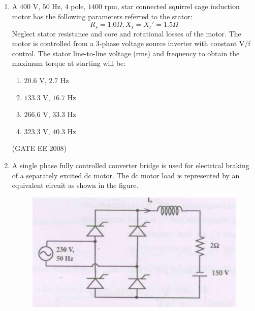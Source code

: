 \documentclass[journal,12pt,onecolumn]{IEEEtran}
\theoremstyle{remark}
\begin{document}
\begin{enumerate}[start=1, label=Q.\arabic*]
The inverter is operated at 50 Hz in $180\degree$ square wave mode. Assume that the load current does not have any dc component. The peak value of the inductor current $i_o$ will be

\begin{multicols}{4}
\begin{enumerate}[label=(\Alph*)]
    \item $6.37$ A
    \item $10$ A
    \item $20$ A
    \item $40$ A
\end{enumerate}
\end{multicols}
\hfill (GATE EE 2008)


\item A $400$ V, $50$ Hz, $4$ pole, $1400$ rpm, star connected squirrel cage induction motor has the following parameters referred to the stator:
$$
R_s = 1.0 \Omega, X_s = X_r' = 1.5 \Omega
$$
Neglect stator resistance and core and rotational losses of the motor.
The motor is controlled from a 3-phase voltage source inverter with constant V/f control. The stator line-to-line voltage (rms) and frequency to obtain the maximum torque at starting will be:

\begin{multicols}{4}
\begin{enumerate}[label=(\Alph*)]
    \item $20.6$ V, $2.7$ Hz
    \item $133.3$ V, $16.7$ Hz
    \item $266.6$ V, $33.3$ Hz
    \item $323.3$ V, $40.3$ Hz
\end{enumerate}
\end{multicols}
\hfill (GATE EE 2008)



\item A single phase fully controlled converter bridge is used for electrical braking of a separately excited dc motor. The dc motor load is represented by an equivalent circuit as shown in the figure.

\begin{figure}[H]
    \centering
    \includegraphics[width=\columnwidth]{Fig/q61.png}
\end{figure}


\end{enumerate}
\end{document}
